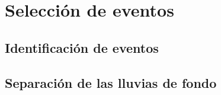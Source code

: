 \chapter{Selecci\'on de eventos}
\label{ch:seleccionRadio}

\section{Identificaci\'on de eventos}

\section{Separaci\'on de las lluvias de fondo}